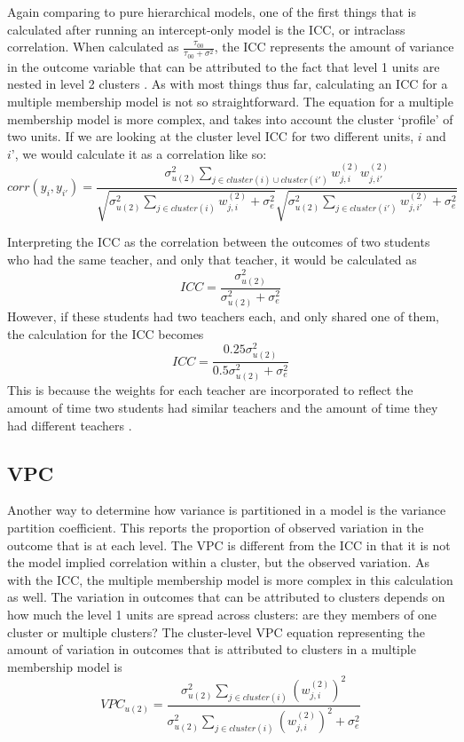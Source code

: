 \documentclass[
]{book}
\begin{document}
Again comparing to pure hierarchical models, one of the first things that is calculated after running an intercept-only model is the ICC, or intraclass correlation. When calculated as \(\frac{\tau_{00}}{\tau_{00} + \sigma^{2}}\), the ICC represents the amount of variance in the outcome variable that can be attributed to the fact that level 1 units are nested in level 2 clusters \citep{SnijdersICC}. As with most things thus far, calculating an ICC for a multiple membership model is not so straightforward. The equation for a multiple membership model is more complex, and takes into account the cluster `profile' of two units. If we are looking at the cluster level ICC for two different units, \(\textit{i}\) and \(\textit{i'}\), we would calculate it as a correlation like so:
\[corr(y_{i}, y_{i'}) = \frac{\sigma_{u(2)}^{2}\sum_{j \in cluster(i) \cup cluster(i')}w_{j,i}^{(2)}w_{j, i'}^{(2)}}{\sqrt{\sigma_{u(2)}^{2}\sum_{j \in cluster(i)}w_{j,i}^{(2)} + \sigma_{e}^2}\sqrt{\sigma_{u(2)}^{2}\sum_{j \in cluster(i')}w_{j,i'}^{(2)} + \sigma_{e}^2}}\]

Interpreting the ICC as the correlation between the outcomes of two students who had the same teacher, and only that teacher, it would be calculated as
\[ICC = \frac{\sigma_{u(2)}^{2}}{\sigma_{u(2)}^{2} + \sigma_{e}^{2}}\]
However, if these students had two teachers each, and only shared one of them, the calculation for the ICC becomes
\[ICC = \frac{0.25\sigma_{u(2)}^{2}}{0.5\sigma_{u(2)}^{2} + \sigma_{e}^{2}}\]
This is because the weights for each teacher are incorporated to reflect the amount of time two students had similar teachers and the amount of time they had different teachers \citep{Leckie2013}.

\hypertarget{vpc}{%
\subsection{VPC}\label{vpc}}

Another way to determine how variance is partitioned in a model is the variance partition coefficient. This reports the proportion of observed variation in the outcome that is at each level. The VPC is different from the ICC in that it is not the model implied correlation within a cluster, but the observed variation. As with the ICC, the multiple membership model is more complex in this calculation as well. The variation in outcomes that can be attributed to clusters depends on how much the level 1 units are spread across clusters: are they members of one cluster or multiple clusters? The cluster-level VPC equation representing the amount of variation in outcomes that is attributed to clusters in a multiple membership model is \citep{Leckie2013}
\[VPC_{u(2)} = \frac{\sigma_{u(2)}^{2}\sum_{j \in cluster(i)}(w_{j,i}^{(2)})^2}{\sigma_{u(2)}^{2}\sum_{j \in cluster(i)}(w_{j,i}^{(2)})^2 + \sigma_{e}^{2}}\]
\end{document}
